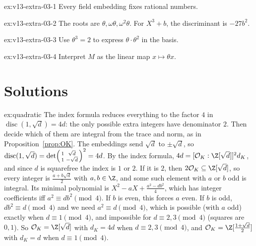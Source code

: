 \begin{hint}{ex:v13-extra-03-1}
Every field embedding fixes rational numbers.
\end{hint}

\begin{hint}{ex:v13-extra-03-2}
The roots are $\theta,\omega\theta,\omega^2\theta$. For $X^3+b$, the discriminant is $-27b^2$.
\end{hint}

\begin{hint}{ex:v13-extra-03-3}
Use $\theta^3=2$ to express $\theta\cdot\theta^2$ in the basis.
\end{hint}

\begin{hint}{ex:v13-extra-03-4}
Interpret $M$ as the linear map $x\mapsto\theta x$.
\end{hint}

\section{Solutions}

\begin{solution}{ex:quadratic}
\idea The index formula reduces everything to the factor $4$ in $\operatorname{disc}(1,\sqrt d)=4d$: the only possible
extra integers have denominator $2$. Then decide which of them are integral from the trace and norm, as in Proposition~\ref{prop:OK}.
\writeup The embeddings send $\sqrt d$ to $\pm\sqrt d$, so $\operatorname{disc}(1,\sqrt d)=\det
\begin{psmallmatrix}1&\sqrt d\\1&-\sqrt d\end{psmallmatrix}^2=4d$. By the index formula,
$4d=[\mathcal O_K:\Z[\sqrt d]]^2d_K$, and since $d$ is squarefree the index is $1$ or $2$. If it is $2$, then
$2\mathcal O_K\subseteq\Z[\sqrt d]$, so every integer is $\frac{a+b\sqrt d}2$ with $a,b\in\Z$, and some such element
with $a$ or $b$ odd is integral. Its minimal polynomial is $X^2-aX+\frac{a^2-db^2}4$, which has integer coefficients
iff $a^2\equiv db^2\pmod4$. If $b$ is even, this forces $a$ even. If $b$ is odd, $db^2\equiv d\pmod 4$ and we need
$a^2\equiv d\pmod 4$, which is possible (with $a$ odd) exactly when $d\equiv1\pmod4$, and impossible for
$d\equiv2,3\pmod4$ (squares are $0,1$). So $\mathcal O_K=\Z[\sqrt d]$ with $d_K=4d$ when $d\equiv2,3\pmod4$, and
$\mathcal O_K=\Z[\frac{1+\sqrt d}2]$ with $d_K=d$ when $d\equiv1\pmod4$.
\end{solution}

